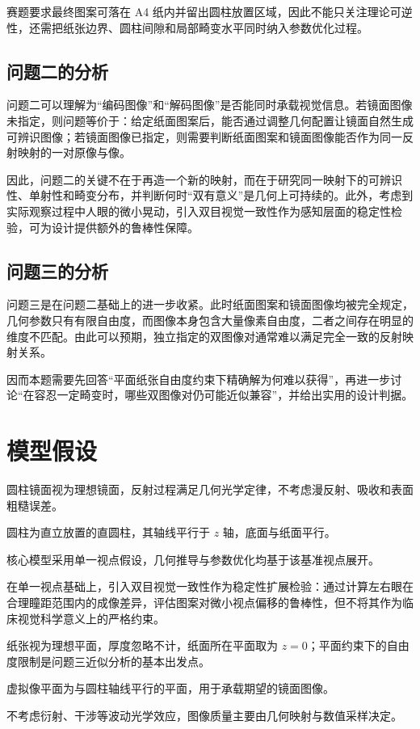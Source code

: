 \documentclass[a4paper,12pt]{ctexart}
\begin{document}
\par 赛题要求最终图案可落在 A4 纸内并留出圆柱放置区域，因此不能只关注理论可逆性，还需把纸张边界、圆柱间隙和局部畸变水平同时纳入参数优化过程。

\subsection{问题二的分析}
\par 问题二可以理解为“编码图像”和“解码图像”是否能同时承载视觉信息。若镜面图像未指定，则问题等价于：给定纸面图案后，能否通过调整几何配置让镜面自然生成可辨识图像；若镜面图像已指定，则需要判断纸面图案和镜面图像能否作为同一反射映射的一对原像与像。

\par 因此，问题二的关键不在于再造一个新的映射，而在于研究同一映射下的可辨识性、单射性和畸变分布，并判断何时“双有意义”是几何上可持续的。此外，考虑到实际观察过程中人眼的微小晃动，引入双目视觉一致性作为感知层面的稳定性检验，可为设计提供额外的鲁棒性保障。

\subsection{问题三的分析}
\par 问题三是在问题二基础上的进一步收紧。此时纸面图案和镜面图像均被完全规定，几何参数只有有限自由度，而图像本身包含大量像素自由度，二者之间存在明显的维度不匹配。由此可以预期，独立指定的双图像对通常难以满足完全一致的反射映射关系。

\par 因而本题需要先回答“平面纸张自由度约束下精确解为何难以获得”，再进一步讨论“在容忍一定畸变时，哪些双图像对仍可能近似兼容”，并给出实用的设计判据。

\section{模型假设}

\begin{compactitem}
\item 圆柱镜面视为理想镜面，反射过程满足几何光学定律，不考虑漫反射、吸收和表面粗糙误差。
\item 圆柱为直立放置的直圆柱，其轴线平行于 $z$ 轴，底面与纸面平行。
\item 核心模型采用单一视点假设，几何推导与参数优化均基于该基准视点展开。
\item 在单一视点基础上，引入双目视觉一致性作为稳定性扩展检验：通过计算左右眼在合理瞳距范围内的成像差异，评估图案对微小视点偏移的鲁棒性，但不将其作为临床视觉科学意义上的严格约束。
\item 纸张视为理想平面，厚度忽略不计，纸面所在平面取为 $z=0$；平面约束下的自由度限制是问题三近似分析的基本出发点。
\item 虚拟像平面为与圆柱轴线平行的平面，用于承载期望的镜面图像。
\item 不考虑衍射、干涉等波动光学效应，图像质量主要由几何映射与数值采样决定。
\end{compactitem}
\end{document}
